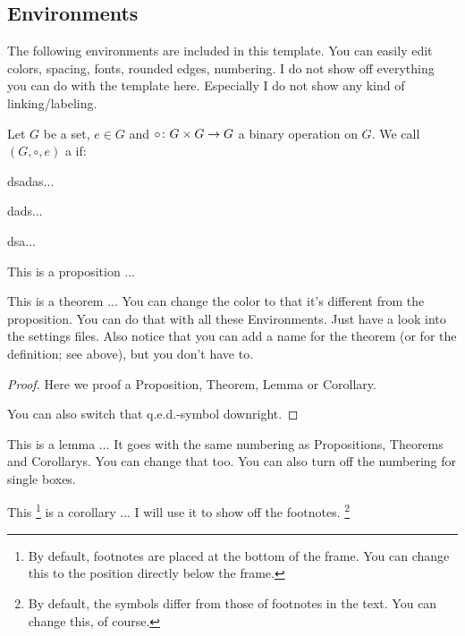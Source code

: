 \documentclass[11pt, a4paper]{article}
\begin{document}
\subsection{Environments}

The following environments are included in this template. You can easily edit colors, spacing, fonts, rounded edges, numbering.
I do not show off everything you can do with the template here. Especially I do not show any kind of linking/labeling.

\begin{definition}[Group]
  Let $G$ be a set, $e \in G$ and $\circ \colon G \times G \to G$ a binary operation on $G$. We call $(G, \circ, e)$ a  if:
  \begin{axioms}[(G1)]
  \item dsadas...
  \item dads...
  \item dsa...
  \end{axioms}
\end{definition}

\begin{proposition}
  This is a proposition ...
\end{proposition}

\begin{theorem}
  This is a theorem ...
  You can change the color to that it's different from the proposition. You can do that with all these Environments. Just have a look into the settings files. Also notice that you can add a name for the theorem (or for the definition; see above), but you don't have to.
\end{theorem}

\begin{proof}
  Here we proof a Proposition, Theorem, Lemma or Corollary.

  You can also switch that q.e.d.-symbol downright.
\end{proof}

\begin{lemma}
  This is a lemma ...
  It goes with the same numbering as Propositions, Theorems and Corollarys. You can change that too. You can also turn off the numbering for single boxes.
\end{lemma}

\begin{corollary}
  This \footnote{By default, footnotes are placed at the bottom of the frame. You can change this to the position directly below the frame.} is a corollary ...
  I will use it to show off the footnotes. \footnote{By default, the symbols differ from those of footnotes in the text. You can change this, of course.}
\end{corollary}
\end{document}
